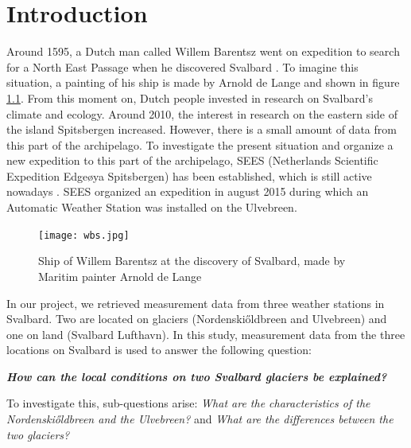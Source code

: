 \documentclass[11pt]{report}
\begin{document}
\newpage
\tableofcontents

\chapter{Introduction}\label{sec:intro}
\setcounter{page}{3}

Around 1595, a Dutch man called Willem Barentsz went on expedition to search for a North East Passage when he discovered Svalbard \cite{sval}. To imagine this situation, a painting of his ship is made by Arnold de Lange and shown in figure \ref{fig:wbs}. From this moment on, Dutch people invested in research on Svalbard's climate and ecology. Around 2010, the interest in research on the eastern side of the island Spitsbergen increased. However, there is a small amount of data from this part of the archipelago. To investigate the present situation and organize a new expedition to this part of the archipelago, SEES (Netherlands Scientific Expedition Edge\o ya Spitsbergen) has been established, which is still active nowadays \cite{sees}. SEES organized an expedition in august 2015 during which an Automatic Weather Station was installed on the Ulvebreen.

\begin{figure}[h]
\texttt{[image: wbs.jpg]}
\centering{}
\caption{Ship of Willem Barentsz at the discovery of Svalbard, made by Maritim painter Arnold de Lange}
\label{fig:wbs}
\end{figure}

In our project, we retrieved measurement data from three weather stations in Svalbard. Two are located on glaciers (Nordenski\H{o}ldbreen and Ulvebreen) and one on land (Svalbard Lufthavn). In this study, measurement data from the three locations on Svalbard is used to answer the following question:

\textbf{\textit{How can the local conditions on two Svalbard glaciers be explained?}}

To investigate this, sub-questions arise:
\textit{What are the characteristics of the Nordenski\H{o}ldbreen and the Ulvebreen?} and \textit{What are the differences between the two glaciers?}
\end{document}
